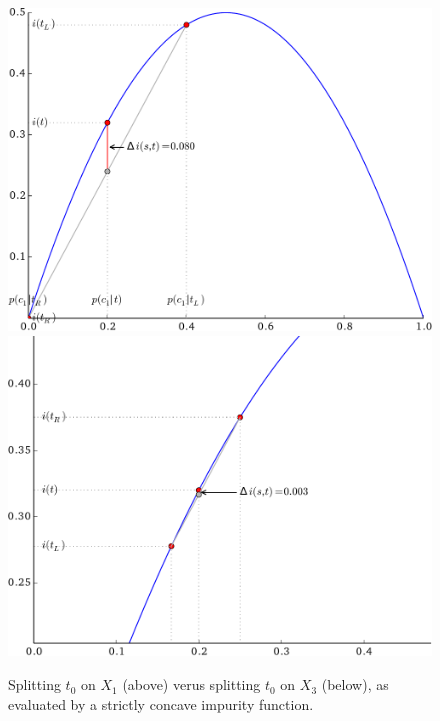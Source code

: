 \begin{figure}
\centering
\includegraphics[scale=0.7]{figures/ch3_toy_x1_gini.pdf}\\
\vspace{1cm}
\includegraphics[scale=0.7]{figures/ch3_toy_x3_gini.pdf}
\caption{Splitting $t_0$ on $X_1$ (above) verus splitting $t_0$ on $X_3$ (below), as evaluated by a strictly concave impurity function.}
\label{fig:3:toy:impurity:gini}
\end{figure}

